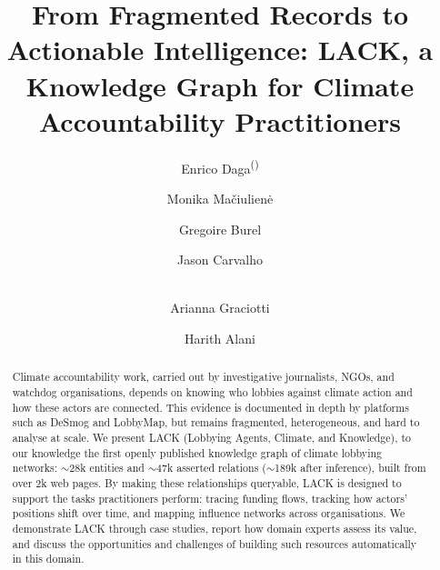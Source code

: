 \documentclass[runningheads]{llncs}
\begin{document}
\title{From Fragmented Records to Actionable Intelligence: LACK, a Knowledge Graph for Climate Accountability Practitioners}
\author{Enrico Daga\textsuperscript{(\Letter)} \and
Monika Mačiulienė \and
Gregoire Burel \and
Jason Carvalho \and\\
Arianna Graciotti \and
Harith Alani }



\maketitle


\begin{abstract}
Climate accountability work, carried out by investigative journalists, NGOs, and watchdog organisations, depends on knowing who lobbies against climate action and how these actors are connected.
This evidence is documented in depth by platforms such as DeSmog and LobbyMap, but remains fragmented, heterogeneous, and hard to analyse at scale.
We present LACK (Lobbying Agents, Climate, and Knowledge), to our knowledge the first openly published knowledge graph of climate lobbying networks: $\sim$28k entities and $\sim$47k asserted relations ($\sim$189k after inference), built from over 2k web pages.
By making these relationships queryable, LACK is designed to support the tasks practitioners perform: tracing funding flows, tracking how actors' positions shift over time, and mapping influence networks across organisations.
We demonstrate LACK through case studies, report how domain experts assess its value, and discuss the opportunities and challenges of building such resources automatically in this domain.
\end{abstract}
\end{document}
